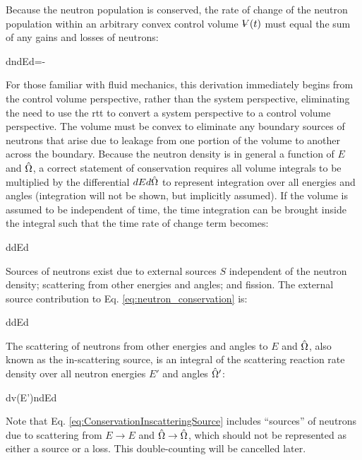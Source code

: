  Because the neutron population is conserved, the rate of change of the neutron population within an arbitrary convex control volume \(\volume(t)\) must equal the sum of any gains and losses of neutrons:

\beq
\label{eq:neutron_conservation}
\left\lbrack{}\int d\volume n\seat\right\rbrack dEd\hO=-
\eeq

For those familiar with fluid mechanics, this derivation immediately begins from the control volume perspective, rather than the system perspective, eliminating the need to use the \gls{rtt} to convert a system perspective to a control volume perspective. The volume must be convex to eliminate any boundary sources of neutrons that arise due to leakage from one portion of the volume to another across the boundary. Because the neutron density is in general a function of \(E\) and \(\hat{\Omega}\), a correct statement of conservation requires all volume integrals to be multiplied by the differential \(dEd\hat{\Omega}\) to represent integration over all energies and angles (integration will not be shown, but implicitly assumed). If the volume is assumed to be independent of time, the time integration can be brought inside the integral such that the time rate of change term becomes:

\beq
\left\lbrack\int d\volume {}\right\rbrack dEd\hO
\eeq

Sources of neutrons exist due to external sources \(S\) independent of the neutron density; scattering from other energies and angles; and fission. The external source contribution to Eq. \eqref{eq:neutron_conservation} is:

\beq
\label{eq:ConservationExternalSource}
\left\lbrack\int d\volume \source \right\rbrack dEd\hO  
\eeq

The scattering of neutrons from other energies and angles to \(E\) and \(\hat{\Omega}\), also known as the in-scattering source, is an integral of the scattering reaction rate density over all neutron energies \(E'\) and angles \(\hat{\Omega}'\):

\beq
\label{eq:ConservationInscatteringSource}
\left\lbrack\int d\volume\inscatteringsource v(E')n\seatelse\right\rbrack dEd\hO  
\eeq

Note that Eq. \eqref{eq:ConservationInscatteringSource} includes ``sources'' of neutrons due to scattering from \(E\rightarrow E\) and \(\hat{\Omega}\rightarrow\hat{\Omega}\), which should not be represented as either a source or a loss. This double-counting will be cancelled later.

